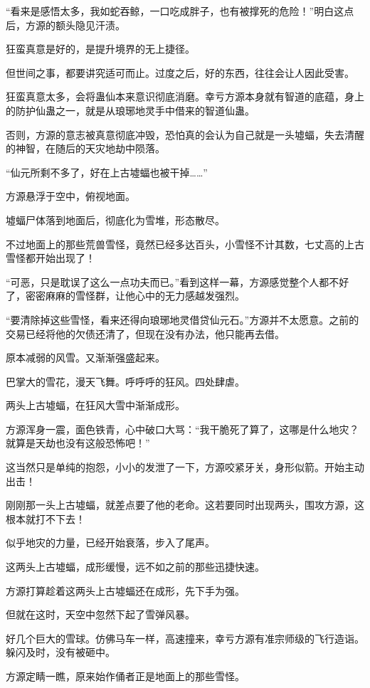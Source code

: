 \begin{this_body}
“看来是感悟太多，我如蛇吞鲸，一口吃成胖子，也有被撑死的危险！”明白这点后，方源的额头隐见汗渍。

狂蛮真意是好的，是提升境界的无上捷径。

但世间之事，都要讲究适可而止。过度之后，好的东西，往往会让人因此受害。

狂蛮真意太多，会将蛊仙本来意识彻底消磨。幸亏方源本身就有智道的底蕴，身上的防护仙蛊之一，就是从琅琊地灵手中借来的智道仙蛊。

否则，方源的意志被真意彻底冲毁，恐怕真的会认为自己就是一头墟蝠，失去清醒的神智，在随后的天灾地劫中陨落。

“仙元所剩不多了，好在上古墟蝠也被干掉……”

方源悬浮于空中，俯视地面。

墟蝠尸体落到地面后，彻底化为雪堆，形态散尽。

不过地面上的那些荒兽雪怪，竟然已经多达百头，小雪怪不计其数，七丈高的上古雪怪都开始出现了！

“可恶，只是耽误了这么一点功夫而已。”看到这样一幕，方源感觉整个人都不好了，密密麻麻的雪怪群，让他心中的无力感越发强烈。

“要清除掉这些雪怪，看来还得向琅琊地灵借贷仙元石。”方源并不太愿意。之前的交易已经将他的欠债还清了，但现在没有办法，他只能再去借。

原本减弱的风雪。又渐渐强盛起来。

巴掌大的雪花，漫天飞舞。呼呼呼的狂风。四处肆虐。

两头上古墟蝠，在狂风大雪中渐渐成形。

方源浑身一震，面色铁青，心中破口大骂：“我干脆死了算了，这哪是什么地灾？就算是天劫也没有这般恐怖吧！”

这当然只是单纯的抱怨，小小的发泄了一下，方源咬紧牙关，身形似箭。开始主动出击！

刚刚那一头上古墟蝠，就差点要了他的老命。这若要同时出现两头，围攻方源，这根本就打不下去！

似乎地灾的力量，已经开始衰落，步入了尾声。

这两头上古墟蝠，成形缓慢，远不如之前的那些迅捷快速。

方源打算趁着这两头上古墟蝠还在成形，先下手为强。

但就在这时，天空中忽然下起了雪弹风暴。

好几个巨大的雪球。仿佛马车一样，高速撞来，幸亏方源有准宗师级的飞行造诣。躲闪及时，没有被砸中。

方源定睛一瞧，原来始作俑者正是地面上的那些雪怪。


\end{this_body}

